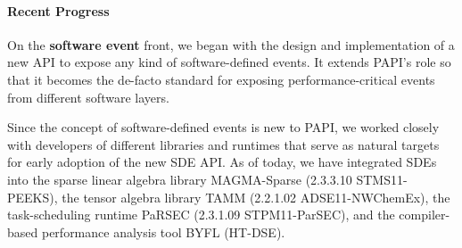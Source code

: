 \paragraph{Recent Progress}

On the \textbf{software event} front, we began with the design and implementation of a new API to 
expose any kind of software-defined events. It extends PAPI's role so that it becomes 
the de-facto standard for exposing performance-critical events from different software
layers.

%

Since the concept of software-defined events is new to PAPI, we worked closely with 
developers of different libraries and runtimes that serve as natural targets for early 
adoption of the new SDE API.
As of today, we have integrated SDEs into the sparse linear algebra library MAGMA-Sparse 
(2.3.3.10 STMS11-PEEKS), the tensor algebra library TAMM (2.2.1.02 ADSE11-NWChemEx), 
the task-scheduling runtime PaRSEC (2.3.1.09 STPM11-ParSEC), and the compiler-based 
performance analysis tool BYFL (HT-DSE). 

